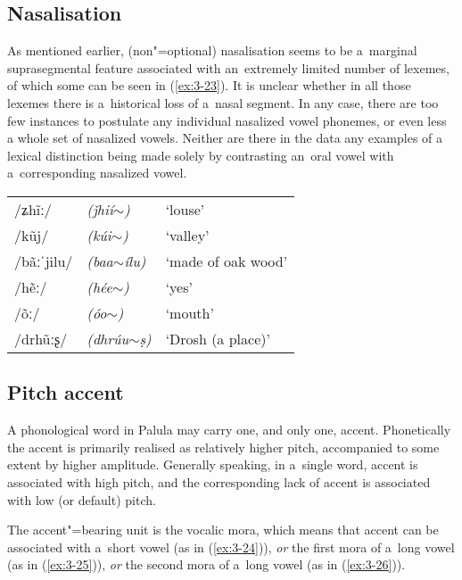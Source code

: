 \subsection{Nasalisation}
\label{subsec:3-4-2}


As mentioned earlier, (non"=optional) nasalisation seems to be a~marginal suprasegmental feature associated with an~extremely limited number of lexemes, of which some can be seen in (\ref{ex:3-23}). It is unclear whether in all those lexemes there is a~historical loss of a~nasal segment. In any case, there are too few instances to postulate any individual nasalized vowel phonemes, or even less a whole set of nasalized vowels. Neither are there in the data any examples of a lexical distinction being made solely by contrasting an~oral vowel with a~corresponding nasalized vowel. 


\begin{exe}
\extab
\label{ex:3-23}
\begin{tabularx}{\textwidth}{ l l l }
/ʑh\~{i}ː/ &
\textit{(ǰhií$\sim$) } &
`louse'\\
/kũj/ &
\textit{(kúi$\sim$)} &
`valley'\\
/bãːˈjilu/ &
\textit{(baa$\sim$ílu)} &
`made of oak wood'\\
/hẽː/ &
\textit{(hée$\sim$)} &
`yes'\\
/õː/ &
\textit{(óo$\sim$)} &
`mouth'\\
/drhũːʂ/ &
\textit{(dhrúu$\sim$ṣ)} &
`Drosh (a place)'\\
\end{tabularx}
\end{exe}

\subsection{Pitch accent}
\label{subsec:3-4-3}

A phonological word in Palula may carry one, and only one, accent. Phonetically the accent is primarily realised as relatively higher pitch, accompanied to some extent by higher amplitude. Generally speaking, in a~single word, accent is associated with high pitch, and the corresponding lack of accent is associated with low (or default) pitch. 

The accent"=bearing unit is the vocalic mora, which means that accent can be associated with a~short vowel (as in (\ref{ex:3-24})), \textit{or} the first mora of a~long vowel (as in (\ref{ex:3-25})), \textit{or} the second mora of a~long vowel (as in (\ref{ex:3-26})).


